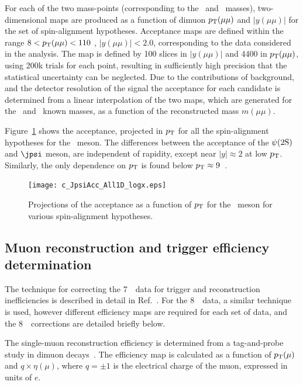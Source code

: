  
For each of the two mass-points (corresponding to the \jpsi\ and \psiprime\ masses), two-dimensional maps are produced
as a function of dimuon $\mbox{$p_{\text{T}}$}(\mu\mu)$ and $|y(\mu\mu)|$ for the set of spin-alignment hypotheses. 
Acceptance maps are defined within the range $8 < \mbox{$p_{\text{T}}$}(\mu\mu) < 110$ \GeV, $|y(\mu\mu)| < 2.0$, corresponding to the data
considered in the analysis. 
The map is defined by 100 slices in $|y(\mu\mu)|$ and 4400 in $\mbox{$p_{\text{T}}$}(\mu\mu)$, using 200k trials for each point, resulting in sufficiently high precision that the statistical uncertainty can be neglected.
Due to the contributions of background, and the detector resolution of the signal the acceptance for each candidate is determined from a linear interpolation of the two maps, which are generated for the \jpsi\ and \psiprime\ known masses, as a function of the reconstructed mass $m(\mu\mu)$.

Figure~\ref{fig:accMapUnpolBoth} shows the acceptance, projected in $\mbox{$p_{\text{T}}$}$ for all the spin-alignment hypotheses for the \jpsi\ meson.
The differences between the acceptance of the $\psi(2\mathrm{S})$ and $\jpsi$ meson, are independent of rapidity, except near $|y|\approx2$
at low $\mbox{$p_{\text{T}}$}$. Similarly, the only dependence on $\mbox{$p_{\text{T}}$}$ is found below $\mbox{$p_{\text{T}}$}\approx9$~\GeV.

\begin{figure}[ht]
  \begin{center}
    \texttt{[image: c\_JpsiAcc\_All1D\_logx.eps]}
     \caption{Projections of the acceptance as a function of $\mbox{$p_{\text{T}}$}$ for the \jpsi\ meson for various spin-alignment hypotheses.}
     \label{fig:accMapUnpolBoth}
  \end{center}
\end{figure}



\subsection{Muon reconstruction and trigger efficiency determination}

\noindent The technique for correcting the 7~\TeV\ data for trigger and reconstruction inefficiencies is described in detail in Ref.~\cite{Aad:2014fpa,Aad2012dlq}.
For the 8~\TeV\ data, a similar technique is used, however different efficiency maps are required for each set of data, and the 8~\TeV\ corrections are detailed briefly below.

The single-muon reconstruction efficiency is determined from a tag-and-probe study in dimuon decays~\cite{Aad:2014kba}.
The efficiency map is calculated as a function of $\mbox{$p_{\text{T}}$} (\mu)$ and  $q\times \eta(\mu)$, where $q=\pm1$ is the electrical charge of the muon, expressed in units of $e$.

